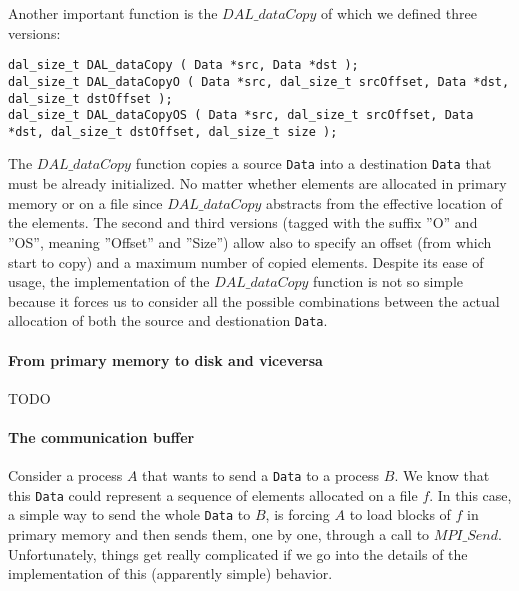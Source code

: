 Another important function is the $DAL\_dataCopy$ of which we defined three versions:
\begin{lstlisting}
dal_size_t DAL_dataCopy ( Data *src, Data *dst ); 
dal_size_t DAL_dataCopyO ( Data *src, dal_size_t srcOffset, Data *dst, dal_size_t dstOffset ); 
dal_size_t DAL_dataCopyOS ( Data *src, dal_size_t srcOffset, Data *dst, dal_size_t dstOffset, dal_size_t size );
\end{lstlisting}
The $DAL\_dataCopy$ function copies a source \texttt{Data} into a destination \texttt{Data} that must be already initialized. No matter whether elements are allocated in primary memory or on a file since $DAL\_dataCopy$ abstracts from the effective location of the elements. The second and third versions (tagged with the suffix ''O'' and ''OS'', meaning ''Offset'' and ''Size'') allow also to specify an offset (from which start to copy) and a maximum number of copied elements. Despite its ease of usage, the implementation of  the $DAL\_dataCopy$ function is not so simple because it forces us to consider all the possible combinations between the actual allocation of both the source and destionation \texttt{Data}. 

\paragraph{From primary memory to disk and viceversa}
TODO

\paragraph{The communication buffer}
Consider a process $A$ that wants to send a \texttt{Data} to a process $B$. We know that this \texttt{Data} could represent a sequence of elements allocated on a file $f$. In this case, a simple way to send the whole \texttt{Data} to $B$, is forcing $A$ to load blocks of $f$ in primary memory and then sends them, one by one, through a call to $MPI\_Send$.  Unfortunately, things get really complicated if we go into the details of the implementation of this (apparently simple) behavior. 

